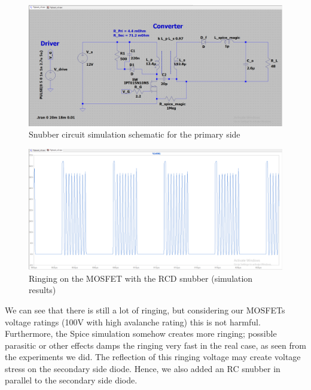 \documentclass[12pt]{article}
\begin{document}
    \begin{figure}[H]
        \centering
        \includegraphics[scale=0.4]{img/snubber_schematic.PNG}
        \caption{Snubber circuit simulation schematic for the primary side}
        \label{fig:snubber}
    \end{figure}

    \begin{figure}[H]
        \centering
        \includegraphics[scale=0.4]{img/snubber_ringing.PNG}
        \caption{Ringing on the MOSFET with the RCD snubber (simulation results)}
        \label{fig:snubber_ringing}
    \end{figure}

    We can see that there is still a lot of ringing, but considering our MOSFETs voltage ratings (100V with high avalanche rating) this is not harmful. Furthermore, the Spice simulation somehow creates more ringing; possible parasitic or other effects damps the ringing very fast in the real case, as seen from the experiments we did. The reflection of this ringing voltage may create voltage stress on the secondary side diode. Hence, we also added an RC snubber in parallel to the secondary side diode. \\
\end{document}
